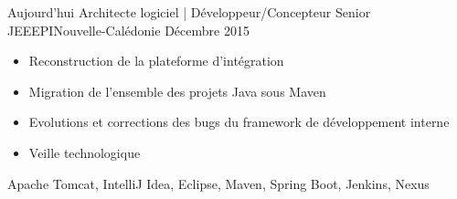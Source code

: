 
\begin{experiences}
  \experience
    {Aujourd'hui}   {Architecte logiciel | Développeur/Concepteur Senior JEE}{EPI}{Nouvelle-Calédonie}
    {Décembre 2015} {
                      \begin{itemize}
                        \item Reconstruction de la plateforme d'intégration                        
                        \item Migration de l'ensemble des projets Java sous Maven                    
                        \item Evolutions et corrections des bugs du framework de développement interne                
                        \item Veille technologique                                                                    
                      \end{itemize}
                    }
                    {Apache Tomcat, IntelliJ Idea, Eclipse, Maven, Spring Boot, Jenkins, Nexus}
  \emptySeparator
\end{experiences}
